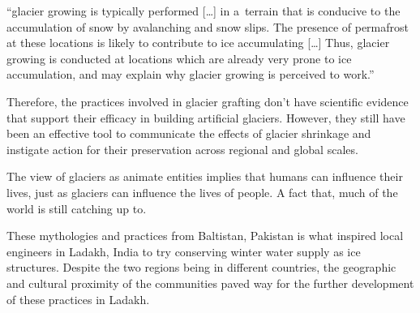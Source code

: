 \begin{thesis_quotation}

“glacier growing is typically performed […] in a terrain that is conducive to the accumulation of snow by
avalanching and snow slips. The presence of permafrost at these locations is likely to contribute to ice
accumulating […] Thus, glacier growing is conducted at locations which are already very prone to ice
accumulation, and may explain why glacier growing is perceived to work.” 

\end{thesis_quotation}

Therefore, the practices involved in glacier grafting don't have scientific evidence that support their efficacy
in building artificial glaciers. However, they still have been an effective tool to communicate the effects of
glacier shrinkage and instigate action for their preservation across regional and global scales. 

The view of glaciers as animate entities implies that humans can influence their lives, just as glaciers can
influence the lives of people. A fact that, much of the world is still catching up to.

These mythologies and practices from Baltistan, Pakistan is what inspired local engineers in Ladakh, India to
try conserving winter water supply as ice structures. Despite the two regions being in different countries, the
geographic and cultural proximity of the communities paved way for the further development of these practices in
Ladakh.
